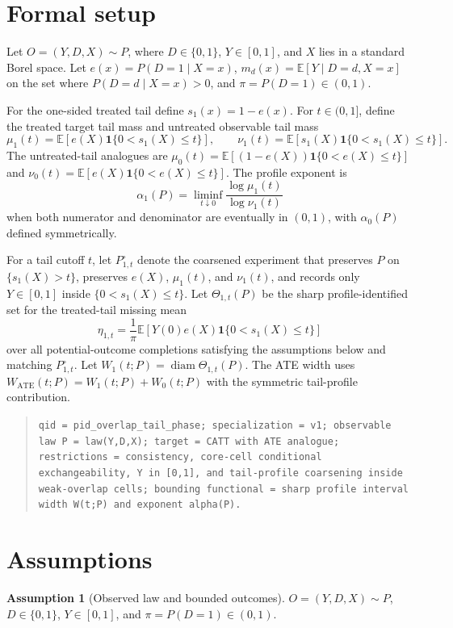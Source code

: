 \documentclass[11pt]{article}
\newcommand{\E}{\mathbb{E}}
\newcommand{\one}{\mathbf{1}}
\theoremstyle{definition}
\newtheorem{assumption}{Assumption}
\theoremstyle{plain}
\theoremstyle{remark}
\begin{document}
\section{Formal setup}
Let \(O=(Y,D,X)\sim P\), where \(D\in\{0,1\}\), \(Y\in[0,1]\), and \(X\) lies in a standard Borel space.  Let \(e(x)=P(D=1\mid X=x)\), \(m_d(x)=\E[Y\mid D=d,X=x]\) on the set where \(P(D=d\mid X=x)>0\), and \(\pi=P(D=1)\in(0,1)\).

For the one-sided treated tail define \(s_1(x)=1-e(x)\).  For \(t\in(0,1]\), define the treated target tail mass and untreated observable tail mass
\[
\mu_1(t)=\E\!\left[e(X)\one\{0<s_1(X)\le t\}\right],\qquad
\nu_1(t)=\E\!\left[s_1(X)\one\{0<s_1(X)\le t\}\right].
\]
The untreated-tail analogues are \(\mu_0(t)=\E[(1-e(X))\one\{0<e(X)\le t\}]\) and \(\nu_0(t)=\E[e(X)\one\{0<e(X)\le t\}]\).  The profile exponent is
\[
\alpha_1(P)=\liminf_{t\downarrow0}\frac{\log \mu_1(t)}{\log \nu_1(t)}
\]
when both numerator and denominator are eventually in \((0,1)\), with \(\alpha_0(P)\) defined symmetrically.

For a tail cutoff \(t\), let \(P^{\circ}_{1,t}\) denote the coarsened experiment that preserves \(P\) on \(\{s_1(X)>t\}\), preserves \(e(X)\), \(\mu_1(t)\), and \(\nu_1(t)\), and records only \(Y\in[0,1]\) inside \(\{0<s_1(X)\le t\}\).  Let \(\Theta_{1,t}(P)\) be the sharp profile-identified set for the treated-tail missing mean
\[
\eta_{1,t}=\frac{1}{\pi}\E\!\left[Y(0)e(X)\one\{0<s_1(X)\le t\}\right]
\]
over all potential-outcome completions satisfying the assumptions below and matching \(P^{\circ}_{1,t}\).  Let \(W_{1}(t;P)=\operatorname{diam}\Theta_{1,t}(P)\).  The ATE width uses \(W_{\mathrm{ATE}}(t;P)=W_1(t;P)+W_0(t;P)\) with the symmetric tail-profile contribution.

\begin{quote}
\texttt{qid = pid\_overlap\_tail\_phase; specialization = v1; observable law P = law(Y,D,X); target = CATT with ATE analogue; restrictions = consistency, core-cell conditional exchangeability, Y in [0,1], and tail-profile coarsening inside weak-overlap cells; bounding functional = sharp profile interval width W(t;P) and exponent alpha(P).}
\end{quote}

\section{Assumptions}
\begin{assumption}[Observed law and bounded outcomes]\label{ass:bounded-law}
\(O=(Y,D,X)\sim P\), \(D\in\{0,1\}\), \(Y\in[0,1]\), and \(\pi=P(D=1)\in(0,1)\).
\end{assumption}
\end{document}
